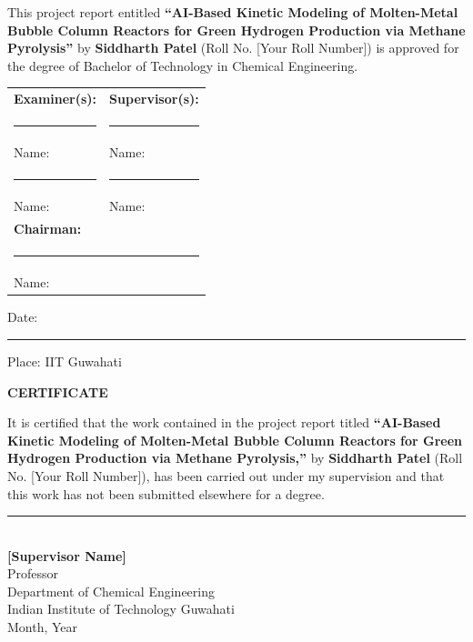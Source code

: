 \documentclass[12pt,a4paper,oneside]{report}
\begin{document}
\noindent This project report entitled \textbf{``AI-Based Kinetic Modeling of Molten-Metal Bubble Column Reactors for Green Hydrogen Production via Methane Pyrolysis''} by \textbf{Siddharth Patel} (Roll No. [Your Roll Number]) is approved for the degree of Bachelor of Technology in Chemical Engineering.

\vspace{35mm}
\noindent
\begin{tabular}{p{75mm}p{75mm}}
\textbf{Examiner(s):} & \textbf{Supervisor(s):} \\[20mm]
\rule{60mm}{0.4pt} & \rule{60mm}{0.4pt} \\
Name: & Name: \\[20mm]
\rule{60mm}{0.4pt} & \rule{60mm}{0.4pt} \\
Name: & Name: \\[25mm]
\multicolumn{2}{l}{\textbf{Chairman:}} \\[15mm]
\multicolumn{2}{l}{\rule{60mm}{0.4pt}} \\
\multicolumn{2}{l}{Name:}
\end{tabular}

\vspace{15mm}
\noindent Date: \rule{40mm}{0.4pt} \hfill Place: IIT Guwahati

\newpage

\begin{center}
{\fontsize{16}{20}\selectfont \textbf{CERTIFICATE}\par}
\end{center}
\vspace{15mm}

\noindent It is certified that the work contained in the project report titled \textbf{``AI-Based Kinetic Modeling of Molten-Metal Bubble Column Reactors for Green Hydrogen Production via Methane Pyrolysis,''} by \textbf{Siddharth Patel} (Roll No. [Your Roll Number]), has been carried out under my supervision and that this work has not been submitted elsewhere for a degree.

\vspace{45mm}
\noindent
\begin{flushright}
\rule{65mm}{0.4pt}\\
\textbf{[Supervisor Name]}\\
Professor\\
Department of Chemical Engineering\\
Indian Institute of Technology Guwahati\\
Month, Year
\end{flushright}
\end{document}
